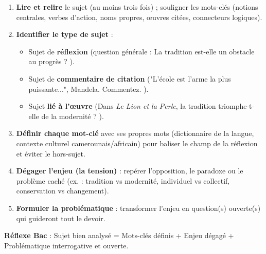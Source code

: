 \documentclass[11pt]{article}
\newcommand{\cle}[1]{{\popxbold\color{popdark}#1}}
\begin{document}
\begin{methode}
\begin{enumerate}
\item \textbf{Lire et relire} le sujet (au moins trois fois) ; souligner les \cle{mots-clés} (notions centrales, verbes d'action, noms propres, œuvres citées, connecteurs logiques).
\item \textbf{Identifier le type de sujet} :
  \begin{itemize}
  \item Sujet de \textbf{réflexion} (question générale : \og La tradition est-elle un obstacle au progrès ? \fg).
  \item Sujet de \textbf{commentaire de citation} (\og "L'école est l'arme la plus puissante...", Mandela. Commentez. \fg).
  \item Sujet \textbf{lié à l'œuvre} (\og Dans \emph{Le Lion et la Perle}, la tradition triomphe-t-elle de la modernité ? \fg).
  \end{itemize}
\item \textbf{Définir chaque mot-clé} avec ses propres mots (dictionnaire de la langue, contexte culturel camerounais/africain) pour baliser le champ de la réflexion et éviter le hors-sujet.
\item \textbf{Dégager l'enjeu (la tension)} : repérer l'opposition, le paradoxe ou le problème caché (ex. : tradition vs modernité, individuel vs collectif, conservation vs changement).
\item \textbf{Formuler la problématique} : transformer l'enjeu en question(s) ouverte(s) qui guideront tout le devoir.
\end{enumerate}
\textbf{Réflexe Bac} : Sujet bien analysé = Mots-clés définis + Enjeu dégagé + Problématique interrogative et ouverte.
\end{methode}
\end{document}
